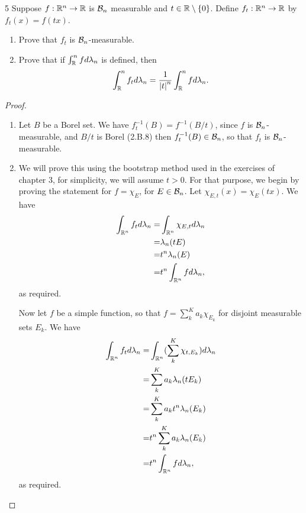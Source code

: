 \begin{exercise}{5}
Suppose $f: \mathbb{R}^n \to \mathbb{R}$ is $\mathcal{B}_n$ measurable and $t \in \mathbb{R} \setminus \{0\}$.
Define $f_t: \mathbb{R}^n \to \mathbb{R}$ by $f_t(x) = f(tx)$.
\begin{enumerate}
    \item Prove that $f_t$ is $\mathcal{B}_n$-measurable.
    \item Prove that if $\int_{\mathbb{R}}^n f d\lambda_n$ is defined, then
    \begin{align*}
        \int_{\mathbb{R}}^n f_t d\lambda_n = \frac{1}{\left\lvert t\right\rvert^n} \int_{\mathbb{R}}^n f d\lambda_n.
    \end{align*}
\end{enumerate}
\end{exercise}
\begin{proof}
\begin{enumerate}
    \item Let $B$ be a Borel set. 
    We have $f_t^{-1}(B) = f^{-1}(B/t)$, since $f$ is $\mathcal{B}_n$-measurable, and $B/t$ is Borel (2.B.8) then $f_t^{-1}(B) \in \mathcal{B}_n$, so that $f_t$ is $\mathcal{B}_n$-measurable.
    \item We will prove this using the bootstrap method used in the exercises of chapter 3, for simplicity, we will assume $t > 0$.
    For that purpose, we begin by proving the statement for $f = \chi_E$, for $E \in \mathcal{B}_n$.
    Let $\chi_{E, t}(x) = \chi_E(tx)$.
    We have
    \begin{align*}
        \int_{\mathbb{R}^n} f_t d\lambda_n
        =& \int_{\mathbb{R}^n} \chi_{E, t} d\lambda_n\\
        =& \lambda_n(tE)\\
        =& t^n \lambda_n(E)\\
        =& t^n \int_{\mathbb{R}^n} f d\lambda_n,
    \end{align*}
    as required.

    Now let $f$ be a simple function, so that $f = \sum_k^K a_k \chi_{E_k}$ for disjoint measurable sets $E_k$.
    We have
    \begin{align*}
        \int_{\mathbb{R}^n} f_t d\lambda_n
        =& \int_{\mathbb{R}^n} (\sum_k^K \chi_{t, E_k}) d\lambda_n\\
        =& \sum_k^K a_k \lambda_n(t E_k)\\
        =& \sum_k^K a_k t^n \lambda_n(E_k)\\
        =& t^n \sum_k^K a_k \lambda_n(E_k)\\
        =& t^n \int_{\mathbb{R}^n} f d\lambda_n,
    \end{align*}
    as required.


\end{enumerate}
\end{proof}
